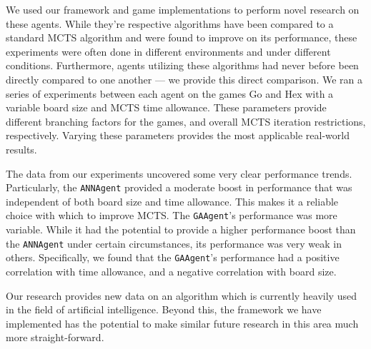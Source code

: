 We used our framework and game implementations to perform novel research on these agents.  While they're respective algorithms have been compared to a standard MCTS algorithm and were found to improve on its performance, these experiments were often done in different environments and under different conditions.  Furthermore, agents utilizing these algorithms had never before been directly compared to one another --- we provide this direct comparison.  We ran a series of experiments between each agent on the games Go and Hex with a variable board size and MCTS time allowance.  These parameters provide different branching factors for the games, and overall MCTS iteration restrictions, respectively.  Varying these parameters provides the most applicable real-world results.

The data from our experiments uncovered some very clear performance trends.  Particularly, the \texttt{ANNAgent} provided a moderate boost in performance that was independent of both board size and time allowance.  This makes it a reliable choice with which to improve MCTS.  The \texttt{GAAgent}'s performance was more variable.  While it had the potential to provide a higher performance boost than the \texttt{ANNAgent} under certain circumstances, its performance was very weak in others.  Specifically, we found that the \texttt{GAAgent}'s performance had a positive correlation with time allowance, and a negative correlation with board size.

Our research provides new data on an algorithm which is currently heavily used in the field of artificial intelligence.  Beyond this, the framework we have implemented has the potential to make similar future research in this area much more straight-forward.